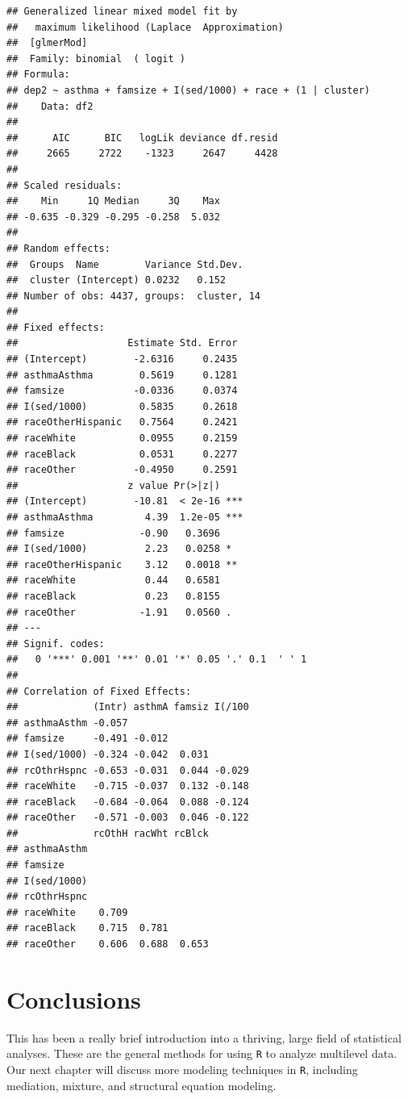 \documentclass[]{tufte-book}
\theoremstyle{definition}
\theoremstyle{definition}
\theoremstyle{remark}
\begin{document}
\begin{verbatim}
## Generalized linear mixed model fit by
##   maximum likelihood (Laplace  Approximation)
##  [glmerMod]
##  Family: binomial  ( logit )
## Formula: 
## dep2 ~ asthma + famsize + I(sed/1000) + race + (1 | cluster)
##    Data: df2
## 
##      AIC      BIC   logLik deviance df.resid 
##     2665     2722    -1323     2647     4428 
## 
## Scaled residuals: 
##    Min     1Q Median     3Q    Max 
## -0.635 -0.329 -0.295 -0.258  5.032 
## 
## Random effects:
##  Groups  Name        Variance Std.Dev.
##  cluster (Intercept) 0.0232   0.152   
## Number of obs: 4437, groups:  cluster, 14
## 
## Fixed effects:
##                   Estimate Std. Error
## (Intercept)        -2.6316     0.2435
## asthmaAsthma        0.5619     0.1281
## famsize            -0.0336     0.0374
## I(sed/1000)         0.5835     0.2618
## raceOtherHispanic   0.7564     0.2421
## raceWhite           0.0955     0.2159
## raceBlack           0.0531     0.2277
## raceOther          -0.4950     0.2591
##                   z value Pr(>|z|)    
## (Intercept)        -10.81  < 2e-16 ***
## asthmaAsthma         4.39  1.2e-05 ***
## famsize             -0.90   0.3696    
## I(sed/1000)          2.23   0.0258 *  
## raceOtherHispanic    3.12   0.0018 ** 
## raceWhite            0.44   0.6581    
## raceBlack            0.23   0.8155    
## raceOther           -1.91   0.0560 .  
## ---
## Signif. codes:  
##   0 '***' 0.001 '**' 0.01 '*' 0.05 '.' 0.1  ' ' 1
## 
## Correlation of Fixed Effects:
##             (Intr) asthmA famsiz I(/100
## asthmaAsthm -0.057                     
## famsize     -0.491 -0.012              
## I(sed/1000) -0.324 -0.042  0.031       
## rcOthrHspnc -0.653 -0.031  0.044 -0.029
## raceWhite   -0.715 -0.037  0.132 -0.148
## raceBlack   -0.684 -0.064  0.088 -0.124
## raceOther   -0.571 -0.003  0.046 -0.122
##             rcOthH racWht rcBlck
## asthmaAsthm                     
## famsize                         
## I(sed/1000)                     
## rcOthrHspnc                     
## raceWhite    0.709              
## raceBlack    0.715  0.781       
## raceOther    0.606  0.688  0.653
\end{verbatim}

\section*{Conclusions}\label{conclusions-2}

This has been a really brief introduction into a thriving, large field
of statistical analyses. These are the general methods for using
\texttt{R} to analyze multilevel data. Our next chapter will discuss
more modeling techniques in \texttt{R}, including mediation, mixture,
and structural equation modeling.
\end{document}
